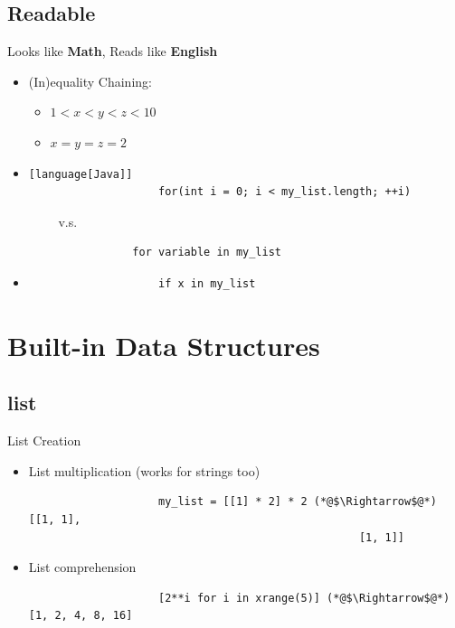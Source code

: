 \documentclass[11pt]{beamer}
\begin{document}
	\subsection{Readable}
		\begin{frame}[fragile]{Looks like \textbf{Math}, Reads like \textbf{English}}
			\begin{itemize}
				\item<1-> (In)equality Chaining:
				\begin{itemize}
					\item $1 < x < y < z < 10$
					\item $x = y = z = 2$
				\end{itemize}
				
				\item<2-> 
				\begin{lstlisting}[language[Java]]
					for(int i = 0; i < my_list.length; ++i)
				\end{lstlisting} 
				$\qquad$ v.s.
				\begin{lstlisting}
				for variable in my_list
				\end{lstlisting}
				
				\item<3-> 
				\begin{lstlisting}
					if x in my_list
				\end{lstlisting}
			\end{itemize}
		\end{frame}
		
		
	\section{Built-in Data Structures}
	\subsection{list}
		\begin{frame}[fragile]{List Creation}
			\begin{itemize}
				\item<1-> List multiplication (works for strings too)
				\begin{lstlisting}
					my_list = [[1] * 2] * 2 (*@$\Rightarrow$@*) [[1, 1], 
					                               [1, 1]]
				\end{lstlisting}
				
				\item<2-> List comprehension
				\begin{lstlisting}
					[2**i for i in xrange(5)] (*@$\Rightarrow$@*) [1, 2, 4, 8, 16]
				\end{lstlisting}
			\end{itemize}
		\end{frame}
		
\end{document}
